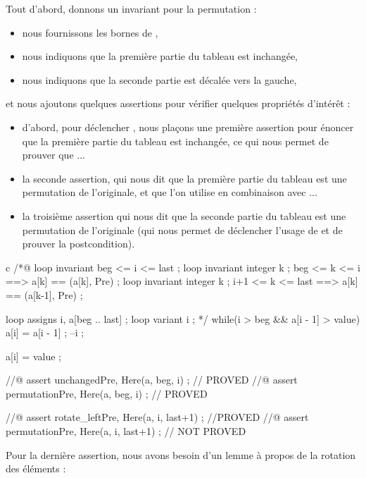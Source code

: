 Tout d'abord, donnons un invariant pour la permutation :
\begin{itemize}
    \item nous fournissons les bornes de ,
    \item nous indiquons que la première partie du tableau est inchangée,
    \item nous indiquons que la seconde partie est décalée vers la gauche,
\end{itemize}
et nous ajoutons quelques assertions pour vérifier quelques propriétés d'intérêt :
\begin{itemize}
    \item d'abord, pour déclencher , nous
          plaçons une première assertion pour énoncer que la première partie
          du tableau est inchangée, ce qui nous permet de prouver que ...
    \item la seconde assertion, qui nous dit que la première partie du tableau
          est une permutation de l'originale, et que l'on utilise en combinaison
          avec ...
    \item la troisième assertion qui nous dit que la seconde partie du tableau
          est une permutation de l'originale (qui nous permet de déclencher
          l'usage de  et de prouver la postcondition).
\end{itemize}


\begin{CodeBlock}{c}
  /*@
    loop invariant beg <= i <= last ;
    loop invariant \forall integer k ; beg <= k <= i    ==> a[k] == \at(a[k], Pre) ;
    loop invariant \forall integer k ; i+1 <= k <= last ==> a[k] == \at(a[k-1], Pre) ;

    loop assigns i, a[beg .. last] ;
    loop variant i ;
  */
  while(i > beg && a[i - 1] > value){
    a[i] = a[i - 1] ;
    --i ;
  }

  a[i] = value ;

  //@ assert unchanged{Pre, Here}(a, beg, i) ;   // PROVED
  //@ assert permutation{Pre, Here}(a, beg, i) ; // PROVED

  //@ assert rotate_left{Pre, Here}(a, i, last+1) ; //PROVED
  //@ assert permutation{Pre, Here}(a, i, last+1) ; // NOT PROVED
\end{CodeBlock}


Pour la dernière assertion, nous avons besoin d'un lemme à propos de la
rotation des éléments :




